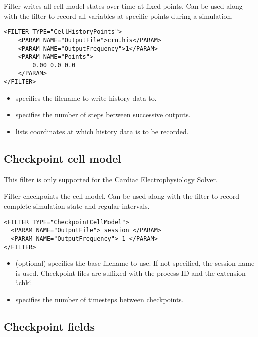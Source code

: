 Filter  writes all cell model states over time at
  fixed points. Can be used along with the  filter to
  record all variables at specific points during a simulation.
\begin{lstlisting}[style=XmlStyle]
<FILTER TYPE="CellHistoryPoints">
    <PARAM NAME="OutputFile">crn.his</PARAM>
    <PARAM NAME="OutputFrequency">1</PARAM>
    <PARAM NAME="Points">
        0.00 0.0 0.0
    </PARAM>
</FILTER>
\end{lstlisting}
    \begin{itemize}
        \item {} specifies the filename to write history data to.
        \item {} specifies the number of steps between successive outputs.
        \item {} lists coordinates at which history data is to be recorded.
    \end{itemize}

\subsection{Checkpoint cell model}\label{filters:CheckpointCellModel}

\begin{notebox}
  This filter is only supported for the Cardiac Electrophysiology Solver.
\end{notebox}

   Filter  checkpoints the cell model. Can be
    used along with the  filter to record complete simulation
    state and regular intervals.
\begin{lstlisting}[style=XmlStyle]
<FILTER TYPE="CheckpointCellModel">
  <PARAM NAME="OutputFile"> session </PARAM>
  <PARAM NAME="OutputFrequency"> 1 </PARAM>
</FILTER>
\end{lstlisting}
    \begin{itemize}
        \item {} (optional) specifies the base filename to use.
    If not specified, the session name is used. Checkpoint files are suffixed with the process ID and the extension `.chk`.
        \item {} specifies the number of timesteps between
    checkpoints.
    \end{itemize}

\subsection{Checkpoint fields}
 
